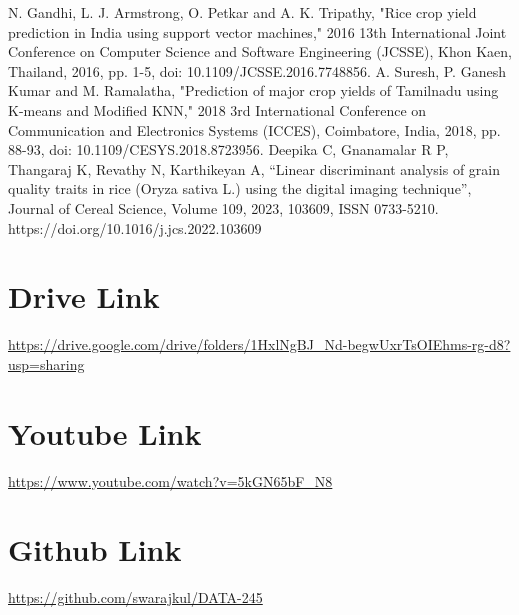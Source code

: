 \begin{thebibliography}{99}
N. Gandhi, L. J. Armstrong, O. Petkar and A. K. Tripathy, "Rice crop yield prediction in India using support vector machines," 2016 13th International Joint Conference on Computer Science and Software Engineering (JCSSE), Khon Kaen, Thailand, 2016, pp. 1-5, doi: 10.1109/JCSSE.2016.7748856.
A. Suresh, P. Ganesh Kumar and M. Ramalatha, "Prediction of major crop yields of Tamilnadu using K-means and Modified KNN," 2018 3rd International Conference on Communication and Electronics Systems (ICCES), Coimbatore, India, 2018, pp. 88-93, doi: 10.1109/CESYS.2018.8723956.
Deepika C, Gnanamalar R P, Thangaraj K, Revathy N, Karthikeyan A, “Linear discriminant analysis of grain quality traits in rice (Oryza sativa L.) using the digital imaging technique”, Journal of Cereal Science, Volume 109, 2023, 103609, ISSN 0733-5210.  https://doi.org/10.1016/j.jcs.2022.103609


\end{thebibliography}



\section{Drive Link}
\url{https://drive.google.com/drive/folders/1HxlNgBJ_Nd-begwUxrTsOIEhms-rg-d8?usp=sharing}

\section{Youtube Link}
\url{https://www.youtube.com/watch?v=5kGN65bF_N8}

\section{Github Link}
\url{https://github.com/swarajkul/DATA-245}



